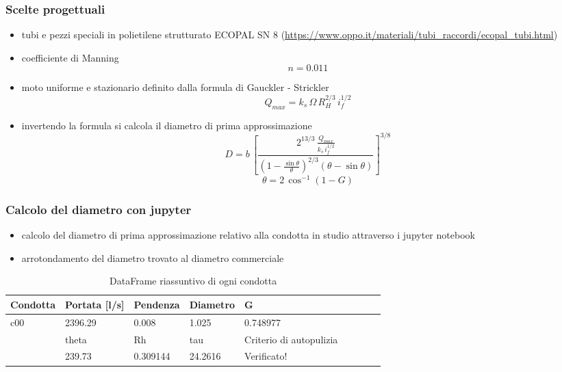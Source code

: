 \documentclass{beamer}
\begin{document}
\begin{frame}
 \frametitle{Scelte progettuali}
 \begin{itemize}
  \item tubi e pezzi speciali in polietilene strutturato ECOPAL SN 8 (\url{https://www.oppo.it/materiali/tubi_raccordi/ecopal_tubi.html})
  \item coefficiente di Manning \[n = 0.011\]
  \item moto uniforme e stazionario definito dalla formula di Gauckler - Strickler
  \[Q_{max} = k_s\,\Omega\,R_H^{2/3}\,i_f^{1/2}\]
  \item invertendo la formula si calcola il diametro di prima approssimazione
  \[
   D = b\,\left[ \frac{2^{13/3}\,\frac{Q_{max}}{k_s\,i_f^{1/2}}}{(1-\frac{\sin \theta}{\theta})^{2/3}(\theta -\sin \theta)}\right]^{3/8}
  \]
  \[
   \theta = 2\, \cos^{-1} (1-G)
  \]
 \end{itemize}
\end{frame}

\begin{frame}
 \frametitle{Calcolo del diametro con jupyter}
    \begin{itemize}
     \item calcolo del diametro di prima approssimazione relativo alla condotta in studio attraverso i jupyter notebook
     \item arrotondamento del diametro trovato al diametro commerciale
    \end{itemize}
 
 \scriptsize
   \begin{table}
   \caption{DataFrame riassuntivo di ogni condotta}
    \begin{tabular}{lllllllll}
        \toprule
        Condotta & Portata [l/s] & Pendenza & Diametro &         G\\
        \midrule
        c00      &       2396.29 &    0.008 &    1.025 &  0.748977\\
        \bottomrule
         &   theta &        Rh &      tau & Criterio di autopulizia \\
         \midrule
          &  239.73 &  0.309144 &  24.2616 &                        Verificato! \\
        \bottomrule
    \end{tabular}    
   \end{table}
\end{frame}
\end{document}
